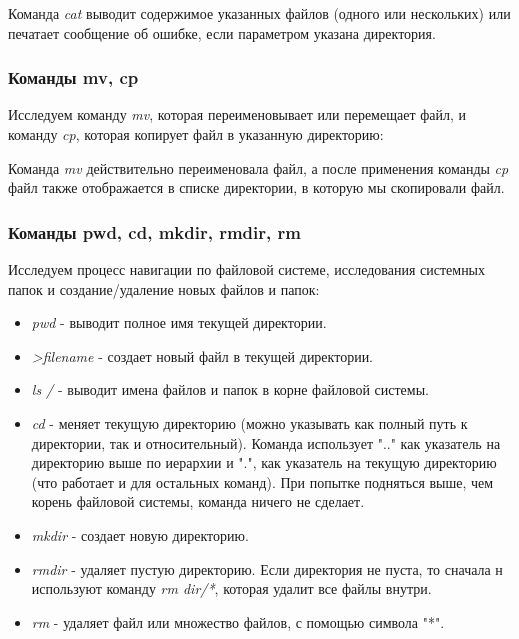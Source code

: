 \documentclass[14pt,a4paper,report]{report}
\begin{document}
Команда \emph{cat} выводит содержимое указанных файлов (одного или нескольких) или печатает сообщение об ошибке, если параметром указана директория.

\subsubsection{Команды mv, cp}

Исследуем команду \emph{mv}, которая переименовывает или перемещает файл, и команду \emph{cp}, которая копирует файл в указанную директорию:



Команда \emph{mv} действительно переименовала файл, а после применения команды \emph{cp} файл также отображается в списке директории, в которую мы скопировали файл.

\subsubsection{Команды pwd, cd, mkdir, rmdir, rm}

Исследуем процесс навигации по файловой системе, исследования системных папок и создание/удаление новых файлов и папок:



\begin{itemize}
	\item \emph{pwd} - выводит полное имя текущей директории.
	\item \emph{>filename} - создает новый файл в текущей директории.
	\item \emph{ls /} - выводит имена файлов и папок в корне файловой системы.
	\item \emph{cd} - меняет текущую директорию (можно указывать как полный путь к директории, так и относительный). Команда использует ".." как указатель на директорию выше по иерархии и ".", как указатель на текущую директорию (что работает и для остальных команд). При попытке подняться выше, чем корень файловой системы, команда ничего не сделает.
	\item \emph{mkdir} - создает новую директорию.
	\item \emph{rmdir} - удаляет пустую директорию. Если директория не пуста, то сначала н используют команду \emph{rm dir/*}, которая удалит все файлы внутри.
	\item \emph{rm} - удаляет файл или множество файлов, с помощью символа "*".
\end{itemize}
\end{document}
